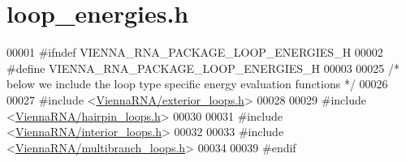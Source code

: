 \hypertarget{loop__energies_8h_source}{}\section{loop\+\_\+energies.\+h}
\label{loop__energies_8h_source}

\begin{DoxyCode}
00001 \textcolor{preprocessor}{#ifndef VIENNA\_RNA\_PACKAGE\_LOOP\_ENERGIES\_H}
00002 \textcolor{preprocessor}{#define VIENNA\_RNA\_PACKAGE\_LOOP\_ENERGIES\_H}
00003 
00025 \textcolor{comment}{/* below we include the loop type specific energy evaluation functions */}
00026 
00027 \textcolor{preprocessor}{#include <\hyperlink{exterior__loops_8h}{ViennaRNA/exterior\_loops.h}>}
00028 
00029 \textcolor{preprocessor}{#include <\hyperlink{hairpin__loops_8h}{ViennaRNA/hairpin\_loops.h}>}
00030 
00031 \textcolor{preprocessor}{#include <\hyperlink{interior__loops_8h}{ViennaRNA/interior\_loops.h}>}
00032 
00033 \textcolor{preprocessor}{#include <\hyperlink{multibranch__loops_8h}{ViennaRNA/multibranch\_loops.h}>}
00034 
00039 \textcolor{preprocessor}{#endif}
\end{DoxyCode}
